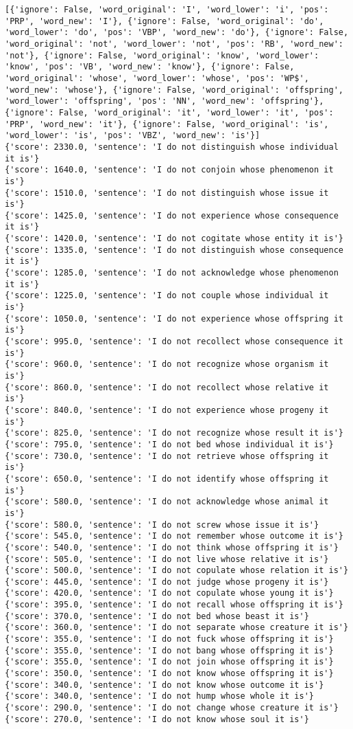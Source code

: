 \documentclass[12pt,a4paper,oneside]{book}
\begin{document}
\begin{verbatim}
[{'ignore': False, 'word_original': 'I', 'word_lower': 'i', 'pos': 'PRP', 'word_new': 'I'}, {'ignore': False, 'word_original': 'do', 'word_lower': 'do', 'pos': 'VBP', 'word_new': 'do'}, {'ignore': False, 'word_original': 'not', 'word_lower': 'not', 'pos': 'RB', 'word_new': 'not'}, {'ignore': False, 'word_original': 'know', 'word_lower': 'know', 'pos': 'VB', 'word_new': 'know'}, {'ignore': False, 'word_original': 'whose', 'word_lower': 'whose', 'pos': 'WP$', 'word_new': 'whose'}, {'ignore': False, 'word_original': 'offspring', 'word_lower': 'offspring', 'pos': 'NN', 'word_new': 'offspring'}, {'ignore': False, 'word_original': 'it', 'word_lower': 'it', 'pos': 'PRP', 'word_new': 'it'}, {'ignore': False, 'word_original': 'is', 'word_lower': 'is', 'pos': 'VBZ', 'word_new': 'is'}]
{'score': 2330.0, 'sentence': 'I do not distinguish whose individual it is'}
{'score': 1640.0, 'sentence': 'I do not conjoin whose phenomenon it is'}
{'score': 1510.0, 'sentence': 'I do not distinguish whose issue it is'}
{'score': 1425.0, 'sentence': 'I do not experience whose consequence it is'}
{'score': 1420.0, 'sentence': 'I do not cogitate whose entity it is'}
{'score': 1335.0, 'sentence': 'I do not distinguish whose consequence it is'}
{'score': 1285.0, 'sentence': 'I do not acknowledge whose phenomenon it is'}
{'score': 1225.0, 'sentence': 'I do not couple whose individual it is'}
{'score': 1050.0, 'sentence': 'I do not experience whose offspring it is'}
{'score': 995.0, 'sentence': 'I do not recollect whose consequence it is'}
{'score': 960.0, 'sentence': 'I do not recognize whose organism it is'}
{'score': 860.0, 'sentence': 'I do not recollect whose relative it is'}
{'score': 840.0, 'sentence': 'I do not experience whose progeny it is'}
{'score': 825.0, 'sentence': 'I do not recognize whose result it is'}
{'score': 795.0, 'sentence': 'I do not bed whose individual it is'}
{'score': 730.0, 'sentence': 'I do not retrieve whose offspring it is'}
{'score': 650.0, 'sentence': 'I do not identify whose offspring it is'}
{'score': 580.0, 'sentence': 'I do not acknowledge whose animal it is'}
{'score': 580.0, 'sentence': 'I do not screw whose issue it is'}
{'score': 545.0, 'sentence': 'I do not remember whose outcome it is'}
{'score': 540.0, 'sentence': 'I do not think whose offspring it is'}
{'score': 505.0, 'sentence': 'I do not live whose relative it is'}
{'score': 500.0, 'sentence': 'I do not copulate whose relation it is'}
{'score': 445.0, 'sentence': 'I do not judge whose progeny it is'}
{'score': 420.0, 'sentence': 'I do not copulate whose young it is'}
{'score': 395.0, 'sentence': 'I do not recall whose offspring it is'}
{'score': 370.0, 'sentence': 'I do not bed whose beast it is'}
{'score': 360.0, 'sentence': 'I do not separate whose creature it is'}
{'score': 355.0, 'sentence': 'I do not fuck whose offspring it is'}
{'score': 355.0, 'sentence': 'I do not bang whose offspring it is'}
{'score': 355.0, 'sentence': 'I do not join whose offspring it is'}
{'score': 350.0, 'sentence': 'I do not know whose offspring it is'}
{'score': 340.0, 'sentence': 'I do not know whose outcome it is'}
{'score': 340.0, 'sentence': 'I do not hump whose whole it is'}
{'score': 290.0, 'sentence': 'I do not change whose creature it is'}
{'score': 270.0, 'sentence': 'I do not know whose soul it is'}


\end{verbatim}
\end{document}
